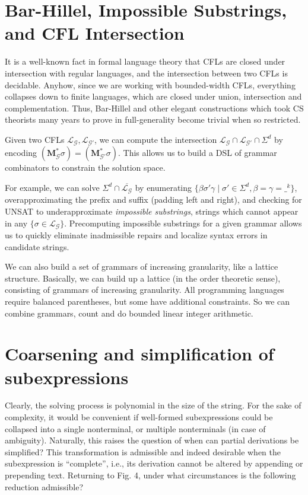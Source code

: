 \documentclass[sigplan,review,anonymous,acmsmall]{acmart}\settopmatter{printfolios=false,printccs=false,printacmref=false}
\begin{document}
    \section{Bar-Hillel, Impossible Substrings, and CFL Intersection}

    It is a well-known fact in formal language theory that CFLs are closed under intersection with regular languages, and the intersection between two CFLs is decidable. Anyhow, since we are working with bounded-width CFLs, everything collapses down to finite languages, which are closed under union, intersection and complementation. Thus, Bar-Hillel and other elegant constructions which took CS theorists many years to prove in full-generality become trivial when so restricted.

    Given two CFLs $\mathcal{L}_\mathcal{G}, \mathcal{L}_{\mathcal{G}'}$, we can compute the intersection $\mathcal{L}_\mathcal{G}\cap\mathcal{L}_{\mathcal{G}'}\cap\Sigma^d$ by encoding $(\mathbf{M}_\mathcal{G}^*\sigma) = (\mathbf{M}_{\mathcal{G}'}^*\sigma)$. This allows us to build a DSL of grammar combinators to constrain the solution space.

    For example, we can solve $\Sigma^d \cap \overline{\mathcal{L}_\mathcal{G}}$ by enumerating $\{\beta\sigma'\gamma \mid \sigma' \in \Sigma^d, \beta = \gamma = \_^k\}$, overapproximating the prefix and suffix (padding left and right), and checking for UNSAT to underapproximate \textit{impossible substrings}, strings which cannot appear in any $\{\sigma \in \mathcal{L}_\mathcal{G}\}$. Precomputing impossible substrings for a given grammar allows us to quickly eliminate inadmissible repairs and localize syntax errors in candidate strings.

    We can also build a set of grammars of increasing granularity, like a lattice structure. Basically, we can build up a lattice (in the order theoretic sense), consisting of grammars of increasing granularity. All programming languages require balanced parentheses, but some have additional constraints. So we can combine grammars, count and do bounded linear integer arithmetic.

\section{Coarsening and simplification of subexpressions}

    Clearly, the solving process is polynomial in the size of the string. For the sake of complexity, it would be convenient if well-formed subexpressions could be collapsed into a single nonterminal, or multiple nonterminals (in case of ambiguity). Naturally, this raises the question of when can partial derivations be simplified? This transformation is admissible and indeed desirable when the subexpression is ``complete'', i.e., its derivation cannot be altered by appending or prepending text. Returning to Fig. 4, under what circumstances is the following reduction admissible?
\end{document}
